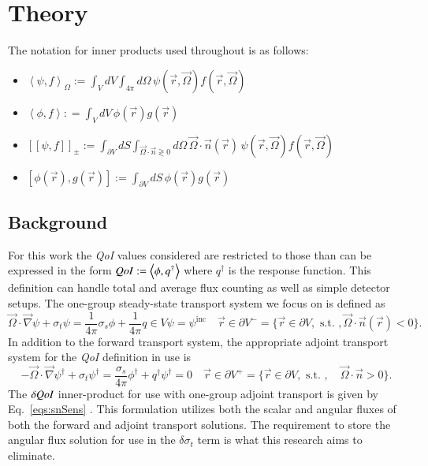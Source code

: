 \documentclass{anstrans}
\newcommand{\vr}{\vec{r}}
\newcommand{\vO}{\vec{\Omega}}
\newcommand{\bra}{\left\langle}
\newcommand{\ket}{\right\rangle}
\newcommand{\braSN}{\left\langle}
\newcommand{\ketSN}{\right\rangle_{\Omega}}
\newcommand{\sbraSN}{\left[ \! \left[}
\newcommand{\sketSN}{\right] \! \right]}
\newcommand{\sbra}{\left[}
\newcommand{\sket}{\right]}
\newcommand{\grad}{\vec{\nabla}}
\newcommand{\bound}{\partial V}
\newcommand{\vn}{\vec{n}}
\newcommand{\sigt}{\sigma_t}
\newcommand{\sigs}{\sigma_s}
\newcommand{\scalResp}{q^\dag}
\newcommand{\qoi}{{\it QoI}\xspace}
\begin{document}
\section{Theory}
The notation for inner products used throughout is as follows:
\begin{itemize}
\item $\braSN \psi , f \ketSN  := \int_V dV \int_{4 \pi} d \Omega \,  \psi(\vr, \vO)f(\vr, \vO) \,$

\item $\bra \phi , f \ket : = \int_V dV \,  \phi(\vr) g(\vr) \,$

\item $\sbraSN \psi , f \sketSN_{\pm}   := \int_{\bound} dS \int_{\vO \cdot \vn \gtrless 0} d\Omega \,  \vO \cdot \vn(\vr) \, \psi(\vr, \vO)f(\vr, \vO) \,$

\item $\sbra \phi(\vr) , g(\vr)  \sket := \int_{\partial V} dS \, \phi (\vr) g (\vr)  \,$
\end{itemize}

\subsection{Background}
For this work the \qoi values considered are restricted to those than can be expressed in the form $\qoi := \bra \phi , q^\dag \ket $ where $q^\dag$ is the response function. This definition can handle total and average flux counting as well as simple detector setups.
The one-group steady-state transport system we focus on is defined as
\begin{subequations}
\begin{equation}
\label{SS1GTE}
\vO \cdot \grad \psi + \sigt \psi = \frac{1}{4 \pi} \sigs \phi + \frac{1}{4 \pi} q \in V
\end{equation}
\begin{equation}
\label{eqs:SS1GTE_bc}
\psi= \psi^{\text{inc}} \quad \vr \in \partial V^{-} = \{ \vr \in \bound, \text{ s.t. }, \vO \cdot \vec{n}(\vr) < 0\}.
\end{equation}
\end{subequations}
In addition to the forward transport system, the appropriate adjoint transport system for the \qoi definition in use is 
\begin{subequations}
\begin{equation}
\label{eqs:transAdj}
- \vO \cdot \grad \psi^\dag + \sigt \psi^\dag = \frac{\sigs}{4 \pi} \phi^\dag + \scalResp
\end{equation}
\begin{equation}
\psi^\dag =0 \quad \vr \in \partial V^{+} = \{  \vr \in \bound , \text{ s.t. }, \quad \vO \cdot \vec{n} > 0 \}.
\end{equation}
\end{subequations}
The $\delta \qoi$ inner-product for use with one-group adjoint transport is given by Eq.~\eqref{eqs:snSens} \cite{Greenspan}. This formulation utilizes both the scalar and angular fluxes of both the forward and adjoint transport solutions. The requirement to store the angular flux solution for use in the $\delta \sigt$ term is what this research aims to eliminate.
\end{document}
